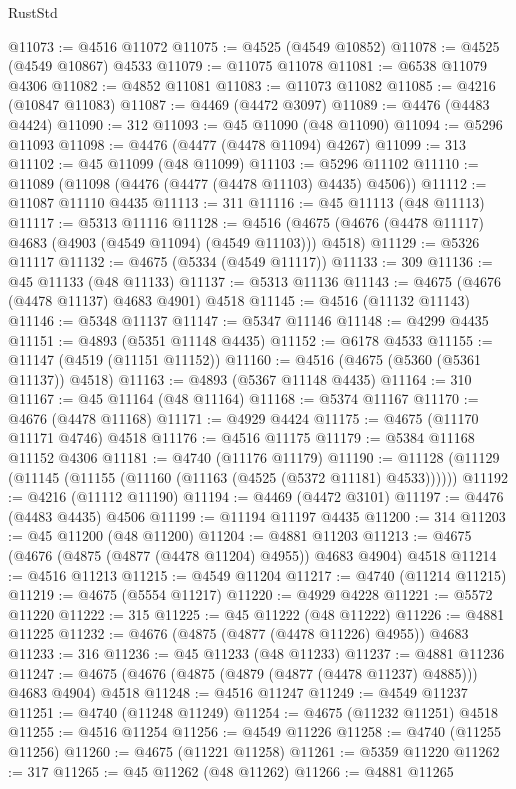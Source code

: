 \begin{lexlean}{RustStd}
\begin{coremodule}
@11073 := @4516 @11072
@11075 := @4525 (@4549 @10852)
@11078 := @4525 (@4549 @10867) @4533
@11079 := @11075 @11078
@11081 := @6538 @11079 @4306
@11082 := @4852 @11081
@11083 := @11073 @11082
@11085 := @4216 (@10847 @11083)
@11087 := @4469 (@4472 @3097)
@11089 := @4476 (@4483 @4424)
@11090 := 312
@11093 := @45 @11090 (@48 @11090)
@11094 := @5296 @11093
@11098 := @4476 (@4477 (@4478 @11094) @4267)
@11099 := 313
@11102 := @45 @11099 (@48 @11099)
@11103 := @5296 @11102
@11110 := @11089 (@11098 (@4476 (@4477 (@4478 @11103) @4435) @4506))
@11112 := @11087 @11110 @4435
@11113 := 311
@11116 := @45 @11113 (@48 @11113)
@11117 := @5313 @11116
@11128 := @4516 (@4675 (@4676 (@4478 @11117) @4683 (@4903 (@4549 @11094) (@4549 @11103))) @4518)
@11129 := @5326 @11117
@11132 := @4675 (@5334 (@4549 @11117))
@11133 := 309
@11136 := @45 @11133 (@48 @11133)
@11137 := @5313 @11136
@11143 := @4675 (@4676 (@4478 @11137) @4683 @4901) @4518
@11145 := @4516 (@11132 @11143)
@11146 := @5348 @11137
@11147 := @5347 @11146
@11148 := @4299 @4435
@11151 := @4893 (@5351 @11148 @4435)
@11152 := @6178 @4533
@11155 := @11147 (@4519 (@11151 @11152))
@11160 := @4516 (@4675 (@5360 (@5361 @11137)) @4518)
@11163 := @4893 (@5367 @11148 @4435)
@11164 := 310
@11167 := @45 @11164 (@48 @11164)
@11168 := @5374 @11167
@11170 := @4676 (@4478 @11168)
@11171 := @4929 @4424
@11175 := @4675 (@11170 @11171 @4746) @4518
@11176 := @4516 @11175
@11179 := @5384 @11168 @11152 @4306
@11181 := @4740 (@11176 @11179)
@11190 := @11128 (@11129 (@11145 (@11155 (@11160 (@11163 (@4525 (@5372 @11181) @4533))))))
@11192 := @4216 (@11112 @11190)
@11194 := @4469 (@4472 @3101)
@11197 := @4476 (@4483 @4435) @4506
@11199 := @11194 @11197 @4435
@11200 := 314
@11203 := @45 @11200 (@48 @11200)
@11204 := @4881 @11203
@11213 := @4675 (@4676 (@4875 (@4877 (@4478 @11204) @4955)) @4683 @4904) @4518
@11214 := @4516 @11213
@11215 := @4549 @11204
@11217 := @4740 (@11214 @11215)
@11219 := @4675 (@5554 @11217)
@11220 := @4929 @4228
@11221 := @5572 @11220
@11222 := 315
@11225 := @45 @11222 (@48 @11222)
@11226 := @4881 @11225
@11232 := @4676 (@4875 (@4877 (@4478 @11226) @4955)) @4683
@11233 := 316
@11236 := @45 @11233 (@48 @11233)
@11237 := @4881 @11236
@11247 := @4675 (@4676 (@4875 (@4879 (@4877 (@4478 @11237) @4885))) @4683 @4904) @4518
@11248 := @4516 @11247
@11249 := @4549 @11237
@11251 := @4740 (@11248 @11249)
@11254 := @4675 (@11232 @11251) @4518
@11255 := @4516 @11254
@11256 := @4549 @11226
@11258 := @4740 (@11255 @11256)
@11260 := @4675 (@11221 @11258)
@11261 := @5359 @11220
@11262 := 317
@11265 := @45 @11262 (@48 @11262)
@11266 := @4881 @11265

\end{coremodule}
\end{lexlean}
